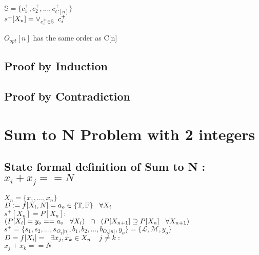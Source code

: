 \documentclass[11pt]{article}
\begin{document}
\begin{center}
$
\mathbb{S} = \{c_1^+,c_2^+,...,c_{C[n]}^+\}
$
\\ \vspace{2mm}
$
s^+[X_n] = \lor_{c_i^+ \in \mathbb{S}}\hspace{2mm} c_i^+
$
\end{center}
$O_{opt}[n]$ has the same order as C[n]

\subsection{Proof by Induction}
\subsection{Proof by Contradiction}

\newpage
\section{Sum to N Problem with 2 integers}
\subsection{State formal definition of Sum to N : $x_i + x_j == N$}
\begin{center}
\vspace{1.5mm}
$
X_n= \{x_1,...,x_n\}
$
\\ \vspace{6mm}
$
D := f \lbrack X_i,N \rbrack = a_{o} \in \{\mathbb{T}, \mathbb{F}\} \hspace{3mm} \forall X_i
$
\\ \vspace{6mm}
$
s^+[X_n]= P[X_n] :
$
\\ \vspace{2mm}
$
(P \lbrack X_i \rbrack = y_{o} == a_{o} \hspace{3mm} \forall X_i) \hspace{2mm} \cap \hspace{2mm} (P[{X}_{n+1}] \supseteq P[X_n] \hspace{3mm} \forall X_{n+1})
$
\\ \vspace{6mm}
$
s^+ = \{ s_1,s_2,...,s_{O_T \lbrack n \rbrack }, b_1, b_2,...,b_{O_S \lbrack n \rbrack},y_o \} = \{ \mathcal{L},\mathcal{M},y_o\}
$
\\ \vspace{6mm}
$
D = f[X_i] = \hspace{2mm} \exists x_j,x_k \in X_n \hspace{4mm} j\neq k: 
$
\\ \vspace{2mm}
$
x_j + x_k == N
$
\end{center}
\end{document}

